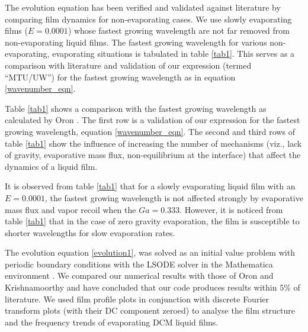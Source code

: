 \documentclass[a4paper,12pt]{article}
\begin{document}
The evolution equation has been verified and validated against literature \citep{Krishnamoorthy1995a, Oron2000b} by comparing film dynamics for non-evaporating cases. We use slowly evaporating films ($E=0.0001$) whose fastest growing wavelength are not far removed from non-evaporating liquid films. The fastest growing wavelength for various non-evaporating, evaporating situations is tabulated in table \ref{tab1}. This serves as a comparison with literature \citep{Krishnamoorthy1995a, Oron2000b} and validation of our expression (termed ``MTU/UW'') for the fastest growing wavelength as in equation \ref{wavenumber_eqn}.

Table \ref{tab1} shows a comparison with the fastest growing wavelength as calculated by Oron \citep{Oron2000b}.  The first row is a validation of our expression for the fastest growing wavelength, equation \ref{wavenumber_eqn}. The second and third rows of table \ref{tab1} show the influence of increasing the number of mechanisms (viz., lack of gravity, evaporative mass flux, non-equilibrium at the interface) that affect the dynamics of a liquid film.

It is observed from table \ref{tab1} that for a slowly evaporating liquid film with an $E=0.0001$, the fastest growing wavelength is not affected strongly by evaporative mass flux and vapor recoil when the $Ga=0.333$. However, it is noticed from table \ref{tab1} that in the case of zero gravity evaporation, the film is susceptible to shorter wavelengths for slow evaporation rates.

The evolution equation \ref{evolution1}, was solved as an initial value problem with periodic boundary conditions with the LSODE solver \citep{Hindmarsh1987a} in the Mathematica environment \citep{Struthers2010a}. We compared our numerical results with those of Oron \citep{Oron2000b} and  Krishnamoorthy\citep{Krishnamoorthy1995a} and have concluded that our code produces results within $5\%$ of literature. We used film profile plots in conjunction with discrete Fourier transform plots (with their DC component zeroed) to analyse the film structure and the frequency trends of evaporating DCM liquid films.
\end{document}
